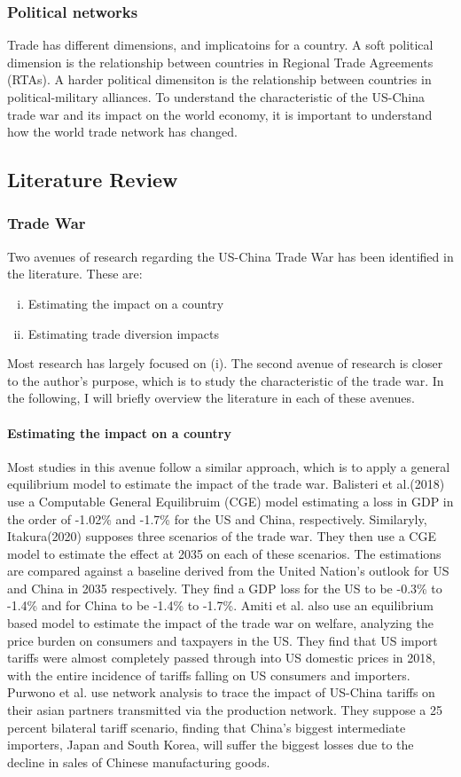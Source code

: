 \documentclass[a4paper, 12pt]{article}
\begin{document}
\subsubsection{Political networks}
Trade has different dimensions, and implicatoins for a country.
A soft political dimension is the relationship between countries in Regional Trade Agreements (RTAs).
A harder political dimensiton is the relationship between countries in political-military alliances.
To understand the characteristic of the US-China trade war and its impact on the world economy, it is important to understand how the world trade network has changed.

% 
\subsection{Literature Review}

\subsubsection{Trade War}
Two avenues of research regarding the US-China Trade War has been identified in the literature.
These are: 
\begin{enumerate}[(i)]
\item Estimating the impact on a country
\item Estimating trade diversion impacts
\end{enumerate}
Most research has largely focused on (i). The second avenue of research is closer to the author's purpose, which is to study the characteristic of the trade war.
In the following, I will briefly overview the literature in each of these avenues.
\paragraph{Estimating the impact on a country}
Most studies in this avenue follow a similar approach, which is to apply a general equilibrium model to estimate the impact of the trade war.
Balisteri et al.(2018)\cite{balistreri2018} use a Computable General Equilibruim (CGE) model estimating a loss in GDP in the order of -1.02\% and -1.7\% for the US and China, respectively.
Similaryly, Itakura(2020)\cite{Itakura2020} supposes three scenarios of the trade war. They then use a CGE model to estimate the effect at 2035 on each of these scenarios. The estimations are compared against a baseline derived from the United Nation’s outlook for US and China in 2035 respectively. They find a GDP loss for the US to be -0.3\% to -1.4\% and for China to be -1.4\% to -1.7\%.
Amiti et al.\cite{Amiti2019} also use an equilibrium based model to estimate the impact of the trade war on welfare, analyzing the price burden on consumers and taxpayers in the US. 
They find that US import tariffs were almost completely passed through into US domestic prices in 2018, with the entire incidence of tariffs falling on US consumers and importers.
Purwono et al.\cite{purwono2021} use network analysis to trace the impact of US-China tariffs on their asian partners transmitted via the production network.
They suppose a 25 percent bilateral tariff scenario, finding that China’s biggest intermediate importers, Japan and South Korea, will suffer the biggest losses due to the decline in sales of Chinese manufacturing goods.
\end{document}
